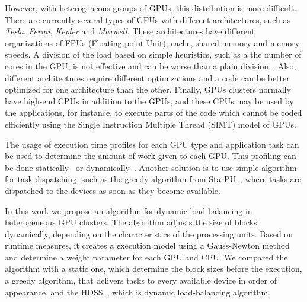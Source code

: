 \documentclass[journal]{IEEEtran}
\begin{document}
However, with heterogeneous groups of GPUs, this distribution is more
difficult. There are currently several types of GPUs with different
architectures, such as \emph{Tesla},​ \emph{Fermi}, \emph{Kepler} and
\emph{Maxwell}. These architectures have different organizations of FPUs
(Floating-point Unit), cache, shared memory and memory speeds. A division of the
load based on simple heuristics, such as a the number of cores in the GPU, is
not effective and can be worse than a plain division~\cite{raphael}. Also,
different architectures require different optimizations and a code can be better
optimized for one architecture than the other. Finally, GPUs clusters normally
have high-end CPUs in addition to the GPUs, and these CPUs may be used by the
applications, for instance, to execute parts of the code which cannot be coded
efficiently using the Single Instruction Multiple Thread (SIMT) model of GPUs.

The usage of execution time profiles for each GPU type and application task can
be used to determine the amount of work given to each GPU. This profiling can be
done statically~\cite{raphael} or dynamically~\cite{acosta, HDSS}. Another
solution is to use simple algorithm for task dispatching, such as the greedy
algorithm from StarPU~\cite{starpu}, where tasks are dispatched to the devices
as soon as they become available.

In this work we propose an algorithm for dynamic load balancing in heterogeneous
GPU clusters. The algorithm adjusts the size of blocks dynamically, depending on
the characteristics of the processing units. Based on runtime measures, it
creates a execution model using a Gauss-Newton method and determine
a weight parameter for each GPU and CPU. We compared the algorithm with a static
one, which determine the block sizes before the execution, a greedy algorithm,
that delivers tasks to every available device in order of appearance, and the
HDSS~\cite{HDSS}, which is dynamic load-balancing algorithm.

% 
% 
% 
% 
\end{document}
